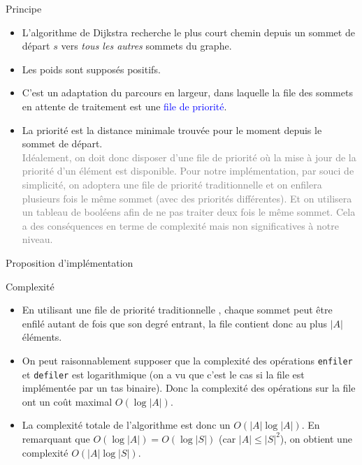 \documentclass[10pt]{beamer}
\begin{document}
\begin{frame}[fragile]{\Ctitle}{\stitle}
	\begin{block}{Principe}
		\begin{itemize}
		\item<1-> L'algorithme de Dijkstra recherche le plus court chemin depuis un sommet de départ $s$ vers \textit{tous les autres} sommets du graphe.
		\item<2-> Les poids sont supposés \textcolor{BrickRed}{positifs}.
		\item<3-> C'est un adaptation du parcours en largeur, dans laquelle la file des sommets en attente de traitement est une \textcolor{blue}{file de priorité}.
		\item<4->  La priorité est la distance minimale trouvée pour le moment depuis le sommet de départ. \\
		\textcolor{gray}{\small Idéalement, on doit donc disposer d'une file de priorité où la mise à jour de la priorité d'un élément est disponible. Pour notre implémentation, par souci de simplicité, on adoptera une file de priorité \og{} traditionnelle \fg{} et on enfilera plusieurs fois le même sommet (avec des priorités différentes). Et on utilisera un tableau de booléens afin de ne pas traiter deux fois le même sommet. Cela a des conséquences en terme de complexité mais non significatives à notre niveau.}
		\end{itemize}
	\end{block}
\end{frame}

\begin{frame}[fragile]{\Ctitle}{\stitle}
	\begin{block}{Proposition d'implémentation}
	\end{block}
\end{frame}

\begin{frame}[fragile]{\Ctitle}{\stitle}
	\begin{block}{Complexité}
		\begin{itemize}
		\item<1-> En utilisant une file de priorité \og{} traditionnelle \fg{}, chaque sommet peut être enfilé autant de fois que son degré entrant, la file contient donc au plus $|A|$ éléments. 
		\item<2-> On peut raisonnablement supposer que la complexité des opérations {\tt enfiler} et {\tt defiler} est logarithmique (on a vu que c'est le cas si la file est implémentée par un tas binaire). Donc la complexité des opérations sur la file ont un coût maximal $O(\log |A|)$.
		\item<3-> La complexité totale de l'algorithme est donc un $O(|A| \log |A|)$. En remarquant que $O(\log |A|)=O(\log |S|)$ (car $|A| \leq |S|^2$), on obtient une complexité \textcolor{BrickRed}{$O(|A|\log|S|)$}.
		\end{itemize}
	\end{block}
\end{frame}
\end{document}
